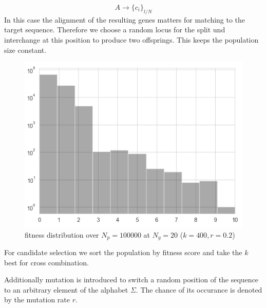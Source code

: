 \documentclass{article}
\begin{document}
\begin{multicols}{2}
  		\[A\rightarrow\{c_i\}_{l/N}\]
  		In this case the alignment of the resulting genes matters for matching to the target sequence.
  		Therefore we choose a random locus for the split und interchange at this position to produce two offsprings. This keeps the population size constant.
  		\begin{figure}[H]
			\center
			\includegraphics[width=\linewidth]{data/population_Ng20_k400.png}
			\caption{fitness distribution over \(N_p=100000\) at \(N_g=20\) (\(k=400, r=0.2\))}
	  		\label{fig:pop}
  		\end{figure}
  		For candidate selection we sort the population by fitness score and take the \(k\) best for cross combination.

  		Additionally mutation is introduced to switch a random position of the sequence to an arbitrary element of the alphabet \(\Sigma\). The chance of its occurance is denoted by the mutation rate \(r\).
  		{}

\end{multicols}
\end{document}
